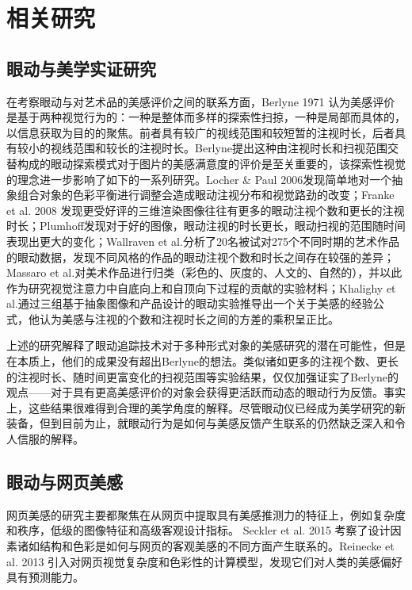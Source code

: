 \documentclass[master, fontset=mac, openany, oneside, zihao=-4]{sjtuthesis}
\begin{document}
\section{相关研究}
\subsection{眼动与美学实证研究}

在考察眼动与对艺术品的美感评价之间的联系方面，Berlyne 1971 认为美感评价是基于两种视觉行为的：一种是整体而多样的探索性扫掠，一种是局部而具体的，以信息获取为目的的聚焦\cite{Berlyne1971}。前者具有较广的视线范围和较短暂的注视时长，后者具有较小的视线范围和较长的注视时长。Berlyne提出这种由注视时长和扫视范围交替构成的眼动探索模式对于图片的美感满意度的评价是至关重要的，该探索性视觉的理念进一步影响了如下的一系列研究。Locher \& Paul 2006发现简单地对一个抽象组合对象的色彩平衡进行调整会造成眼动注视分布和视觉路劲的改变\cite{Locher2006}；Franke et al. 2008 发现更受好评的三维渲染图像往往有更多的眼动注视个数和更长的注视时长\cite{Franke2008}；Plumhoff发现对于好的图像，眼动注视的时长更长，眼动扫视的范围随时间表现出更大的变化\cite{Plumhoff2009}；Wallraven et al.分析了20名被试对275个不同时期的艺术作品的眼动数据，发现不同风格的作品的眼动注视个数和时长之间存在较强的差异\cite{Wallraven2009}；Massaro et al.对美术作品进行归类（彩色的、灰度的、人文的、自然的），并以此作为研究视觉注意力中自底向上和自顶向下过程的贡献的实验材料\cite{Massaro}；Khalighy et al.通过三组基于抽象图像和产品设计的眼动实验推导出一个关于美感的经验公式，他认为美感与注视的个数和注视时长之间的方差的乘积呈正比\cite{Khalighy2015}。

上述的研究解释了眼动追踪技术对于多种形式对象的美感研究的潜在可能性，但是在本质上，他们的成果没有超出Berlyne的想法。类似诸如更多的注视个数、更长的注视时长、随时间更富变化的扫视范围等实验结果，仅仅加强证实了Berlyne的观点——对于具有更高美感评价的对象会获得更活跃而动态的眼动行为反馈。事实上，这些结果很难得到合理的美学角度的解释。尽管眼动仪已经成为美学研究的新装备，但到目前为止，就眼动行为是如何与美感反馈产生联系的仍然缺乏深入和令人信服的解释。


\subsection{眼动与网页美感}
网页美感的研究主要都聚焦在从网页中提取具有美感推测力的特征上，例如复杂度和秩序\cite{Deng2010}，低级的图像特征\cite{Zheng}和高级客观设计指标\cite{Ivory}。
Seckler et al. 2015 考察了设计因素诸如结构和色彩是如何与网页的客观美感的不同方面产生联系的\cite{Seckler2015Linking}。Reinecke et al. 2013 引入对网页视觉复杂度和色彩性的计算模型，发现它们对人类的美感偏好具有预测能力\cite{Reinecke}。
\end{document}
